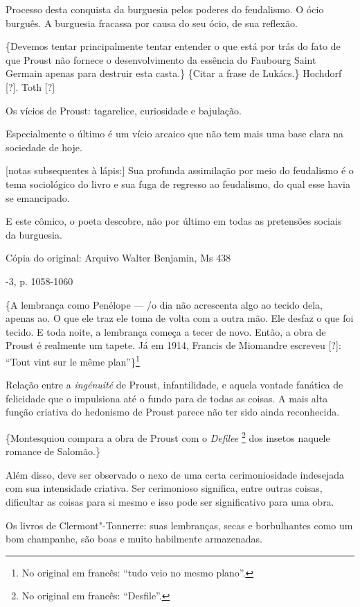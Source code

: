 Processo desta conquista da burguesia pelos poderes do feudalismo. O
ócio burguês. A burguesia fracassa por causa do seu ócio, de sua
reflexão.

\{Devemos tentar principalmente tentar entender o que está por trás do
fato de que Proust não fornece o desenvolvimento da essência do Faubourg
Saint Germain apenas para destruir esta casta.\} \{Citar a frase de
Lukács.\} Hochdorf {[}?{]}. Toth {[}?{]}

Os vícios de Proust: tagarelice, curiosidade e bajulação.

Especialmente o último é um vício arcaico que não tem mais uma base
clara na sociedade de hoje.

{[}notas subsequentes à lápis:{]} Sua profunda assimilação por meio do
feudalismo é o tema sociológico do livro e sua fuga de regresso ao
feudalismo, do qual esse havia se emancipado.

E este cômico, o poeta descobre, não por último em todas as pretensões
sociais da burguesia.

Cópia do original: Arquivo Walter Benjamin, Ms 438

-3, p. 1058-1060

\{A lembrança como Penélope --- /o dia não acrescenta algo ao tecido dela,
apenas ao. O que ele traz ele toma de volta com a outra mão. Ele desfaz
o que foi tecido. E toda noite, a lembrança começa a tecer de novo.
Então, a obra de Proust é realmente um tapete. Já em 1914, Francis de
Miomandre escreveu {[}?{]}: ``Tout vint sur le même plan''\}\footnote{No original em francês: ``tudo veio no mesmo plano''. \versal{[N. T.]}}

Relação entre a \emph{ingénuité} de Proust, infantilidade, e aquela
vontade fanática de felicidade que o impulsiona até o fundo para de
todas as coisas. A mais alta função criativa do hedonismo de Proust
parece não ter sido ainda reconhecida.

\{Montesquiou compara a obra de Proust com o \emph{Defilee} \footnote{No original em francês: ``Desfile''. \versal{[N. T.]}} dos insetos naquele romance de
Salomão.\}

Além disso, deve ser observado o nexo de uma certa cerimoniosidade
indesejada com sua intensidade criativa. Ser cerimonioso significa,
entre outras coisas, dificultar as coisas para si mesmo e isso pode ser
significativo para uma obra.

Os livros de Clermont"-Tonnerre: suas lembranças, secas e borbulhantes
como um bom champanhe, são boas e muito habilmente armazenadas.

